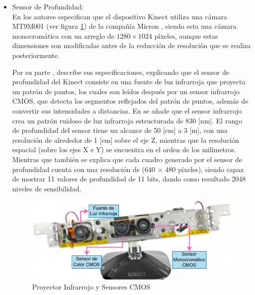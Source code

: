             \begin{itemize}
                \item Sensor de Profundidad: \\
                En \cite{kramer_hacking_2012} los autores especifican que el dispositivo Kinect utiliza una cámara MT9M001 (ver figura \ref{fig:Kinect_Sensors}) de la compañía Micron \cite{micron_12-inch_2004}, siendo esta una cámara monocromática con un arreglo de $1280\times1024$ píxeles, aunque estas dimensiones son modificadas antes de la reducción de resolución que se realiza posteriormente.

                Por su parte \cite{davison_kinect_2012}, describe sus especificaciones, explicando que el sensor de profundidad del Kinect consiste en una fuente de luz infrarroja que proyecta un patrón de puntos, los cuales son leídos después por un sensor infrarrojo CMOS, que detecta los segmentos reflejados del patrón de puntos, además de convertir sus intensidades a distancias. En  \cite{kramer_hacking_2012} se añade que el sensor infrarrojo crea un patrón ruidoso de luz infrarroja estructurada de 830 [nm]. El rango de profundidad del sensor tiene un alcance de 50 [cm] a 3 [m], con una resolución de alrededor de 1 [cm] sobre el eje Z, mientras que la resolución espacial (sobre los ejes X e Y) se encuentra en el orden de los milímetros. Mientras que \cite{davison_kinect_2012} también se explica que cada cuadro generado por el sensor de profundidad cuenta con una resolución de (640 $\times$ 480 píxeles), siendo capaz de mostrar 11 valores de profundidad de 11 bits, dando como resultado 2048 niveles de sensibilidad.

                \begin{figure}[ht]
                    \centering
                    \includegraphics[scale=0.35]{Figures/Kinect_open.png}
                    \caption{Proyector Infrarrojo y Sensores CMOS \cite{eetimes_inside_2010}}
                    \label{fig:Kinect_Sensors}
                \end{figure}



\end{itemize}
